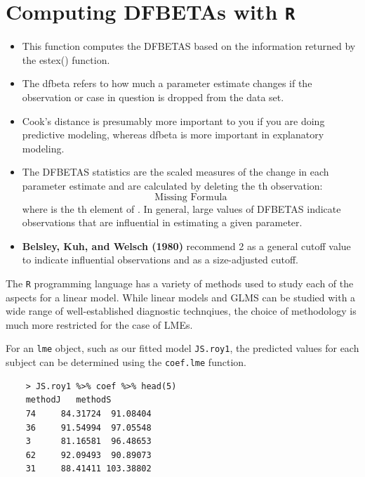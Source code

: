 \documentclass[12pt, a4paper]{report}
\begin{document}
	\section{Computing DFBETAs with \texttt{R}}
	
	\begin{itemize}
		\item This function computes the DFBETAS based on the information returned by the estex() function.
		\item The dfbeta refers to how much a parameter estimate changes if the observation or case in question is dropped from the data set.  
		\item Cook's distance is presumably more important to you if you are doing predictive modeling, whereas dfbeta is more important in explanatory modeling.
		
		\item The DFBETAS statistics are the scaled measures of the change in each parameter estimate and are calculated by deleting the th observation:
		\[ \mbox{Missing Formula}\]
		where  is the th element of .
		In general, large values of DFBETAS indicate observations that are influential in estimating a given parameter. \item \textbf{Belsley, Kuh, and Welsch (1980)} recommend 2 as a general cutoff value to indicate influential observations and  as a size-adjusted cutoff.
	\end{itemize}
	

	
	
	
The \texttt{R} programming language has a variety of methods used to study each of the aspects for a linear model. While linear models and GLMS can be studied with a wide range of well-established diagnostic technqiues, the choice of methodology is much more restricted for the case of LMEs.

For an \texttt{lme} object, such as our fitted model \texttt{JS.roy1}, the predicted values for each subject can be determined using the \texttt{coef.lme} function.
\begin{framed}
	\begin{verbatim}
	> JS.roy1 %>% coef %>% head(5)
	methodJ   methodS
	74     84.31724  91.08404
	36     91.54994  97.05548
	3      81.16581  96.48653
	62     92.09493  90.89073
	31     88.41411 103.38802
	\end{verbatim}
\end{framed}
\end{document}
